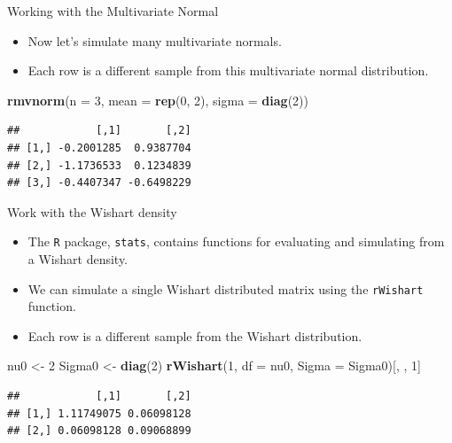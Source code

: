 \documentclass[
  ignorenonframetext,
]{beamer}
\newenvironment{Shaded}{\begin{snugshade}}{\end{snugshade}}
\newcommand{\DataTypeTok}[1]{\textcolor[rgb]{0.13,0.29,0.53}{#1}}
\newcommand{\DecValTok}[1]{\textcolor[rgb]{0.00,0.00,0.81}{#1}}
\newcommand{\KeywordTok}[1]{\textcolor[rgb]{0.13,0.29,0.53}{\textbf{#1}}}
\newcommand{\NormalTok}[1]{#1}
\newcommand{\StringTok}[1]{\textcolor[rgb]{0.31,0.60,0.02}{#1}}
\providecommand{\tightlist}{%
  \setlength{\itemsep}{0pt}\setlength{\parskip}{0pt}}
\begin{document}
\begin{frame}[fragile]{Working with the Multivariate Normal}
\protect\hypertarget{working-with-the-multivariate-normal}{}

\begin{itemize}
\tightlist
\item
  Now let's simulate many multivariate normals.
\item
  Each row is a different sample from this multivariate normal
  distribution.
\end{itemize}

\begin{Shaded}
\begin{Highlighting}[]
\KeywordTok{rmvnorm}\NormalTok{(}\DataTypeTok{n =} \DecValTok{3}\NormalTok{, }\DataTypeTok{mean =} \KeywordTok{rep}\NormalTok{(}\DecValTok{0}\NormalTok{, }\DecValTok{2}\NormalTok{), }\DataTypeTok{sigma =} \KeywordTok{diag}\NormalTok{(}\DecValTok{2}\NormalTok{))}
\end{Highlighting}
\end{Shaded}

\begin{verbatim}
##            [,1]       [,2]
## [1,] -0.2001285  0.9387704
## [2,] -1.1736533  0.1234839
## [3,] -0.4407347 -0.6498229
\end{verbatim}

\end{frame}

\begin{frame}[fragile]{Work with the Wishart density}
\protect\hypertarget{work-with-the-wishart-density}{}

\begin{itemize}
\item
  The \texttt{R} package, \texttt{stats}, contains functions for
  evaluating and simulating from a Wishart density.
\item
  We can simulate a single Wishart distributed matrix using the
  \texttt{rWishart} function.
\item
  Each row is a different sample from the Wishart distribution.
\end{itemize}

\begin{Shaded}
\begin{Highlighting}[]
\NormalTok{nu0 <-}\StringTok{ }\DecValTok{2}
\NormalTok{Sigma0 <-}\StringTok{ }\KeywordTok{diag}\NormalTok{(}\DecValTok{2}\NormalTok{)}
\KeywordTok{rWishart}\NormalTok{(}\DecValTok{1}\NormalTok{, }\DataTypeTok{df =}\NormalTok{ nu0, }\DataTypeTok{Sigma =}\NormalTok{ Sigma0)[, , }\DecValTok{1}\NormalTok{]}
\end{Highlighting}
\end{Shaded}

\begin{verbatim}
##            [,1]       [,2]
## [1,] 1.11749075 0.06098128
## [2,] 0.06098128 0.09068899
\end{verbatim}

\end{frame}
\end{document}

